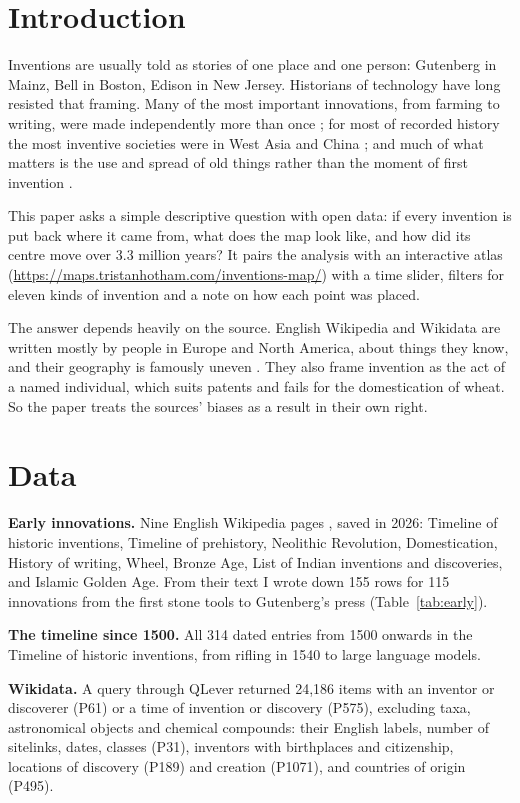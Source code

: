 \documentclass[11pt,a4paper]{article}
\begin{document}
\section{Introduction}
Inventions are usually told as stories of one place and one person: Gutenberg in Mainz, Bell in Boston, Edison in New Jersey. Historians of technology have long resisted that framing. Many of the most important innovations, from farming to writing, were made independently more than once \citep{diamond,larson}; for most of recorded history the most inventive societies were in West Asia and China \citep{needham,mokyr}; and much of what matters is the use and spread of old things rather than the moment of first invention \citep{edgerton}.

This paper asks a simple descriptive question with open data: if every invention is put back where it came from, what does the map look like, and how did its centre move over 3.3 million years? It pairs the analysis with an interactive atlas (\url{https://maps.tristanhotham.com/inventions-map/}) with a time slider, filters for eleven kinds of invention and a note on how each point was placed.

The answer depends heavily on the source. English Wikipedia and Wikidata \citep{wikidata} are written mostly by people in Europe and North America, about things they know, and their geography is famously uneven \citep{graham}. They also frame invention as the act of a named individual, which suits patents and fails for the domestication of wheat. So the paper treats the sources' biases as a result in their own right.

\section{Data}
\textbf{Early innovations.} Nine English Wikipedia pages \citep{wp}, saved in 2026: Timeline of historic inventions, Timeline of prehistory, Neolithic Revolution, Domestication, History of writing, Wheel, Bronze Age, List of Indian inventions and discoveries, and Islamic Golden Age. From their text I wrote down 155 rows for 115 innovations from the first stone tools to Gutenberg's press (Table~\ref{tab:early}).

\textbf{The timeline since 1500.} All 314 dated entries from 1500 onwards in the Timeline of historic inventions, from rifling in 1540 to large language models.

\textbf{Wikidata.} A query through QLever \citep{qlever} returned 24,186 items with an inventor or discoverer (P61) or a time of invention or discovery (P575), excluding taxa, astronomical objects and chemical compounds: their English labels, number of sitelinks, dates, classes (P31), inventors with birthplaces and citizenship, locations of discovery (P189) and creation (P1071), and countries of origin (P495).
\end{document}
